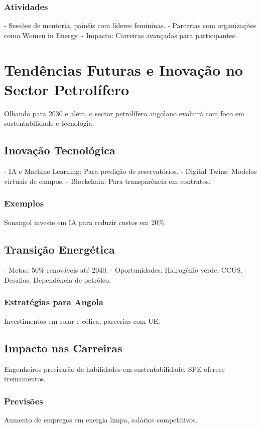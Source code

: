 \documentclass[12pt]{article}
\begin{document}
\subsubsection{Atividades}
- Sessões de mentoria, painéis com líderes femininas.
- Parcerias com organizações como Women in Energy.
- Impacto: Carreiras avançadas para participantes.

\newpage

\section{Tendências Futuras e Inovação no Sector Petrolífero}

Olhando para 2030 e além, o sector petrolífero angolano evoluirá com foco em sustentabilidade e tecnologia.

\subsection{Inovação Tecnológica}
- IA e Machine Learning: Para predição de reservatórios.
- Digital Twins: Modelos virtuais de campos.
- Blockchain: Para transparência em contratos.

\subsubsection{Exemplos}
Sonangol investe em IA para reduzir custos em 20\%.

\subsection{Transição Energética}
- Metas: 50\% renováveis até 2040.
- Oportunidades: Hidrogênio verde, CCUS.
- Desafios: Dependência de petróleo.

\subsubsection{Estratégias para Angola}
Investimentos em solar e eólica, parcerias com UE.

\subsection{Impacto nas Carreiras}
Engenheiros precisarão de habilidades em sustentabilidade. SPE oferece treinamentos.

\subsubsection{Previsões}
Aumento de empregos em energia limpa, salários competitivos.
\end{document}
